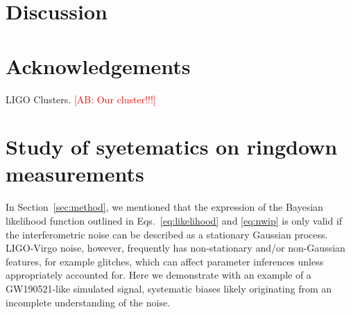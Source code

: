 \documentclass[twocolumn,prd,superscriptaddress,amsfonts,amssymb,amsmath,preprintnumbers]{revtex4-1}
\newcommand{\comment}[1]{\textcolor{red}{[#1]}}
\begin{document}
\section{Discussion}\label{sec:discussion}

\section*{Acknowledgements}
\label{sec:acknowledgements}
LIGO Clusters. \comment{AB: Our cluster!!!}


\appendix

\section{Study of syetematics on ringdown measurements}\label{sec:noise_systematics}

In Section~\ref{sec:method}, we mentioned that the expression of the Bayesian likelihood function outlined in Eqs.~\ref{eq:likelihood} and \ref{eq:nwip} is only valid if the interferometric noise can be described as a stationary Gaussian process. LIGO-Virgo noise, however, frequently has non-stationary and/or non-Gaussian features, for example glitches, which can affect parameter inferences unless appropriately accounted for. Here we demonstrate with an example of a GW190521-like simulated signal, systematic biases likely originating from an incomplete understanding of the noise. 
\end{document}
